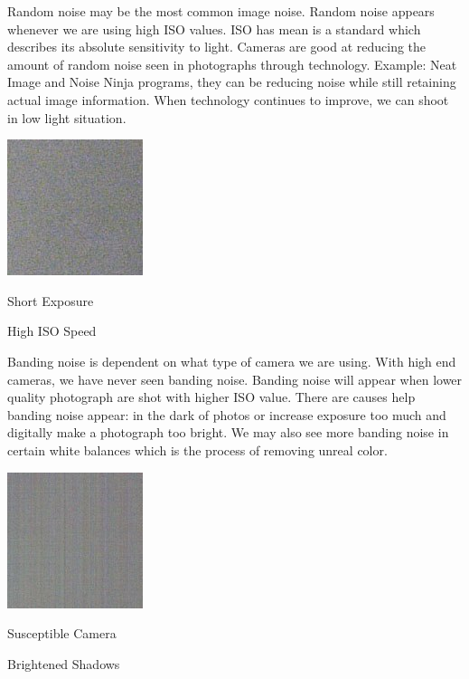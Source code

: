 \begin{itemize}
Random noise may be the most common image noise. Random noise appears whenever we are using high ISO
values. ISO has mean is a standard which describes its absolute sensitivity to light. 
Cameras are good at reducing the amount of random noise seen in photographs through technology. Example: Neat Image and Noise Ninja programs, they can be reducing noise while still retaining actual image information. 
When technology continues to
improve, we can shoot in low light situation.

\begin{center}
	\includegraphics{random.png}

Short Exposure

High ISO Speed
\end{center}




Banding noise is dependent on what type of camera we are using. With high end cameras, we have never seen banding noise. Banding noise will appear when lower quality photograph are shot with higher
ISO value.
There are causes help banding noise appear: in the dark of photos or increase exposure too much and
digitally make a photograph too bright. We may also see more banding noise in certain white balances which is the process of removing unreal color.
\vspace{0.5cm}

\begin{center}
	\includegraphics{banding.png}

Susceptible Camera

Brightened Shadows
\end{center}

\end{itemize}

